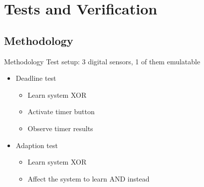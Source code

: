 \section{Tests and Verification}
\subsection{Methodology}
\begin{frame}{Methodology}
  Test setup: 3 digital sensors, 1 of them emulatable
	\begin{itemize}
		\item Deadline test
      \begin{itemize}
        \item Learn system XOR
        \item Activate timer button
        \item Observe timer results
      \end{itemize}
    \item Adaption test
      \begin{itemize}
        \item Learn system XOR
        \item Affect the system to learn AND instead
      \end{itemize}
	\end{itemize}
\end{frame}

